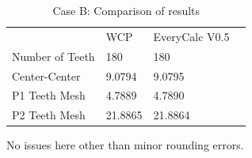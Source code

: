 \documentclass[10pt,letterpaper]{article}
\begin{document}
	\begin{table}[H]
	\begin{tabular}{llll}
	                 & WCP     & EveryCalc V0.5 \\ \cline{1-3} 
	 Number of Teeth & 180     & 180      \\
	 Center-Center   & 9.0794  & 9.0795  \\
	 P1 Teeth Mesh   & 4.7889  & 4.7890 \\
	 P2 Teeth Mesh   & 21.8865 & 21.8864 
	\end{tabular}
	\caption{Case B: Comparison of results}
	\end{table}

	No issues here other than minor rounding errors.
	
\end{document}
